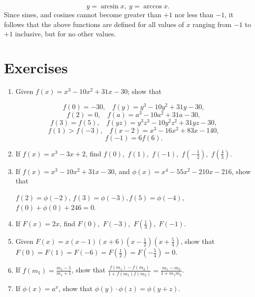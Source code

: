 \begin{equation}
y = \arcsin x,\ y = \arccos x.
\label{eqn:4}
\end{equation}
Since sines, and cosines cannot become greater than $+1$ nor 
less than $-1$, it follows that the above functions are 
defined for all values of $x$ ranging from $-1$ to $+1$ 
inclusive, but for no other values.


\section{Exercises}


\begin{enumerate}
\item
Given $f(x) = x^3 - 10x^2 + 31x - 30$; show that

\[
f(0) 	= -30,\ \ \ \ f(y) = y^3 - 10y^2 + 31y - 30,
\]
\[
f(2) = 0,\ \ \ \  f(a) 	= a^3 - 10a^2 + 31a - 30,
\]
\[
 f(3) =	f(5),\ \ \ \ 
f(yz) 	= y^3z^3 - 10y^2z^2 + 31yz - 30,
\]
\[
   f(1) > f( − 3),\ \ \ \ 
f(x − 2) 	= x^3 - 16x^2 + 83x - 140,
\]
\[
  f( - 1) 	= 6f(6). 
\]

\item
If $f(x) = x^3 - 3x + 2$, find $f(0)$,\ $f(1)$,\ $f(-1)$,\ 
$f \left ( -\frac{1}{2} \right )$,\ 
$f \left ( \frac{4}{3} \right )$.

\item
If $f(x) = x^3 - 10x^2 + 31x - 30$, and 
$\phi (x) = x^4 − 55x^2 − 210x − 216$, show that

$f(2) = \phi ( - 2)$,
$f(3) = \phi( - 3),f(5) = \phi( - 4)$,
$f(0) + \phi (0) + 246 = 0$.

\item
If $F(x) = 2x$, find $F(0)$,\ $F(-3)$,\ 
$F \left ( \frac{1}{3} \right )$,\ $F(-1)$.

\item
Given $F(x) 
= x(x - 1)(x + 6) \left ( x - \frac{1}{2} \right ) 
\left (x + \frac{5}{4} \right )$, show that
$F(0) = F(1) = F(-6) = F \left (\frac{1}{2} \right ) 
= F \left ( -\frac{5}{4} \right ) = 0$. 

\item
If $f(m_1) = \frac{m_1 - 1}{m_1 + 1}$, show that
$\frac{f(m_1) - f(m_2)}{1 + f(m_1)f(m_2)} = \frac{m_1 - m_2}{1 + m_1 m_2}$.

\item
If $\phi (x) = a^x$, show that $\phi(y) \cdot \phi(z) = \phi(y + z)$.


\end{enumerate}
